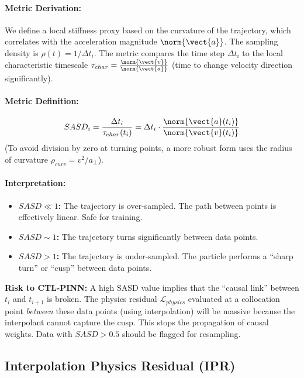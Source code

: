 \paragraph{Metric Derivation:}
We define a local stiffness proxy based on the curvature of the trajectory, which correlates with the acceleration magnitude $\norm{\vect{a}}$. The sampling density is $\rho(t) = 1/\Delta t_i$.
The metric compares the time step $\Delta t_i$ to the local characteristic timescale $\tau_{char} = \frac{\norm{\vect{v}}}{\norm{\vect{a}}}$ (time to change velocity direction significantly).

\paragraph{Metric Definition:}
\begin{equation}
    SASD_i = \frac{\Delta t_i}{\tau_{char}(t_i)} = \Delta t_i \cdot \frac{\norm{\vect{a}(t_i)}}{\norm{\vect{v}(t_i)}}
\end{equation}
(To avoid division by zero at turning points, a more robust form uses the radius of curvature $\rho_{curv} = v^2/a_{\perp}$).

\paragraph{Interpretation:}
\begin{itemize}
    \item \textbf{$SASD \ll 1$:} The trajectory is over-sampled. The path between points is effectively linear. Safe for training.
    \item \textbf{$SASD \sim 1$:} The trajectory turns significantly between data points.
    \item \textbf{$SASD > 1$:} The trajectory is under-sampled. The particle performs a ``sharp turn'' or ``cusp'' between data points.
\end{itemize}

\textbf{Risk to CTL-PINN:} A high SASD value implies that the ``causal link'' between $t_i$ and $t_{i+1}$ is broken. The physics residual $\mathcal{L}_{physics}$ evaluated at a collocation point \textit{between} these data points (using interpolation) will be massive because the interpolant cannot capture the cusp. This stops the propagation of causal weights. Data with $SASD > 0.5$ should be flagged for resampling.

\subsection{Interpolation Physics Residual (IPR)}

